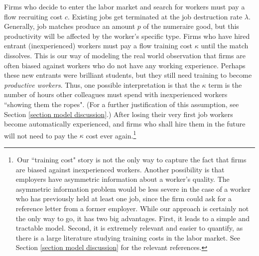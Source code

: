 \documentclass[12pt]{article} %
\theoremstyle{definition}
\begin{document}
Firms who decide to enter the labor market and search for workers must pay a flow recruiting cost $c$. Existing jobs get terminated at the job destruction rate $\lambda$. Generally, job matches produce an amount $p$ of the numeraire good, but this productivity will be affected by the worker's specific type. Firms who have hired entrant (inexperienced) workers must pay a flow training cost $\kappa$ until the match dissolves. This is our way of modeling the real world observation that firms are often biased against workers who do not have any working experience. Perhaps these new entrants were brilliant students, but they still need training to become \textit{productive workers}. Thus, one possible interpretation is that the $\kappa$ term is the number of hours other colleagues must spend with inexperienced workers ``showing them the ropes". (For a further justification of this assumption, see Section \ref{section model discussion}.) After losing their very first job workers become automatically experienced, and firms who shall hire them in the future will not need to pay the $\kappa$ cost ever again.\footnote{\,Our ``training cost" story is not the only way to capture the fact that firms are biased against inexperienced workers. Another possibility is that employers have asymmetric information about a worker's quality. The asymmetric information problem would be less severe in the case of a worker who has previously held at least one job, since the firm could ask for a reference letter from a former employer. While our approach is certainly not the only way to go, it has two big advantages. First, it leads to a simple and tractable model. Second, it is extremely relevant and easier to quantify, as there is a large literature studying training costs in the labor market. See Section \ref{section model discussion} for the relevant references.} 
\end{document}
